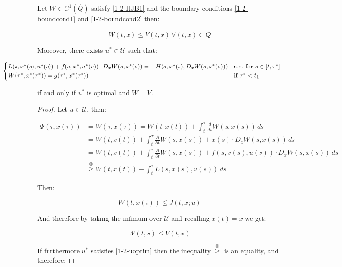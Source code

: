 \begin{theorem}\label{1-2-Verificationthe}
    Let $W\in C^1(\overline{Q})$ satisfy \ref{1-2-HJB1} and the boundary conditions \ref{1-2-boundcond1} and \ref{1-2-boundcond2} then:

    \[W(t,x)\leq V(t,x) \, \forall (t,x)\in\overline{Q}\]

    Moreover, there exists $u^{\ast}\in\mathcal{U}$ such that:

    \begin{equation}\label{1-2-uoptim}
        \hspace{-20mm}\begin{cases}
            L(s,x^{\ast}(s),u^{\ast}(s)) + f(s,x^{\ast},u^{\ast}(s))\cdot D_xW(s,x^{\ast}(s)) = - H(s,x^{\ast}(s),D_xW(s,x^{\ast}(s))) & \text{a.s. for } s\in[t,\tau^{\ast}] \\
            W(\tau^{\ast},x^{\ast}(\tau^{\ast})) = g(\tau^{\ast},x^{\ast}(\tau^{\ast})) & \text{if } \tau^{\ast}<t_1
        \end{cases}    
    \end{equation}

    if and only if $u^{\ast}$ is optimal and $W=V$.

    \begin{proof}
        Let $u\in\mathcal{U}$, then:

        \begin{align*}
            \Psi(\tau,x(\tau)) & = W(\tau,x(\tau)) = W(t,x(t)) + \int_t^{\tau}\frac{d}{ds}W(s,x(s)) \,ds \\
            & = W(t,x(t)) + \int_t^{\tau} \frac{\partial}{\partial t}W(s,x(s)) + \dot{x}(s)\cdot D_xW(s,x(s)) \,ds \\
            & = W(t,x(t)) + \int_t^{\tau} \frac{\partial}{\partial t}W(s,x(s)) + f(s,x(s),u(s))\cdot D_xW(s,x(s)) \,ds \\
            & \overset{\circledast}{\geq} W(t,x(t)) - \int_t^{\tau} L(s,x(s),u(s)) \,ds  
        \end{align*}

        Then:

        \[W(t,x(t)) \leq J(t,x;u)\]

        And therefore by taking the infimum over $\mathcal{U}$ and recalling $x(t)=x$ we get:

        \[W(t,x) \leq V(t,x)\]

        If furthermore $u^{\ast}$ satisfies \ref{1-2-uoptim} then the inequality $\overset{\circledast}{\geq}$ is an equality, and therefore:


\end{proof}
\end{theorem}
